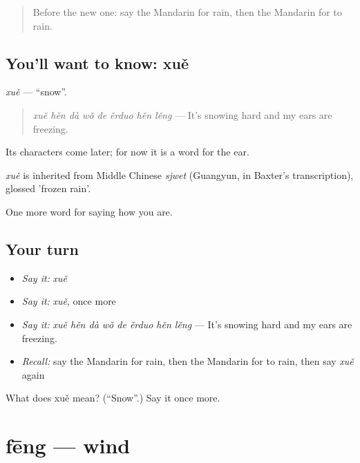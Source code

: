 \label{lesson:ZH-C66-xue}



\begin{quote}
Before the new one: say the Mandarin for rain, then the Mandarin for to rain.
\end{quote}

\subsection*{You'll want to know: xuě}
\emph{xuě} — \textquotedblleft{}snow\textquotedblright{}.

\begin{quote}
\emph{xuě hěn dà wǒ de ěrduo hěn lěng} — It's snowing hard and my ears are freezing.
\end{quote}

Its characters come later; for now it is a word for the ear.

\begin{cousinweb}
\emph{xuě} is inherited from Middle Chinese \emph{sjwet} (Guangyun, in Baxter's transcription), glossed 'frozen rain'.
\end{cousinweb}

\begin{grammarlens}[title={What you've built}]
One more word for saying how you are.
\end{grammarlens}

\subsection*{Your turn}
\begin{itemize}
\raggedright
  \item \emph{Say it:} \emph{xuě}
  \item \emph{Say it:} \emph{xuě}, once more
  \item \emph{Say it:} \emph{xuě hěn dà wǒ de ěrduo hěn lěng} — It's snowing hard and my ears are freezing.
  \item \emph{Recall:} say the Mandarin for rain, then the Mandarin for to rain, then say \emph{xuě} again
\end{itemize}

\begin{tcolorbox}[breakable,colback=teal!4,colframe=teal!35!black,title={Before you move on}]
What does xuě mean? (\textquotedblleft{}Snow\textquotedblright{}.) Say it once more.
\end{tcolorbox}
\section[fēng]{fēng — wind}

